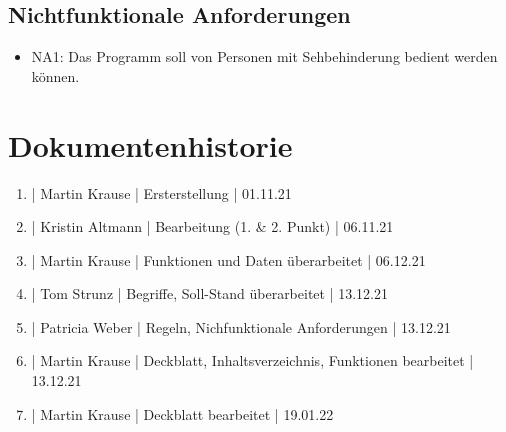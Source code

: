 \documentclass[12pt]{scrartcl}
\begin{document}
\subsection{Nichtfunktionale Anforderungen}

\begin{itemize}
	\item NA1: Das Programm soll von Personen mit Sehbehinderung bedient werden können.
\end{itemize}

\section{Dokumentenhistorie}

\begin{enumerate}
	\item | Martin Krause | Ersterstellung | 01.11.21
	\item | Kristin Altmann | Bearbeitung (1. \& 2. Punkt) | 06.11.21
	\item | Martin Krause | Funktionen und Daten überarbeitet | 06.12.21
	\item | Tom Strunz | Begriffe, Soll-Stand überarbeitet | 13.12.21
	\item | Patricia Weber | Regeln, Nichfunktionale Anforderungen | 13.12.21
	\item | Martin Krause | Deckblatt, Inhaltsverzeichnis, Funktionen bearbeitet | 13.12.21
	\item | Martin Krause | Deckblatt bearbeitet | 19.01.22
\end{enumerate}
 
\end{document}
